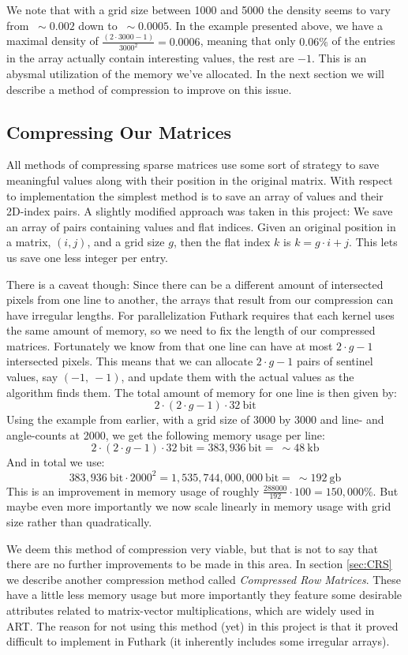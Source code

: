 We note that with a grid size between 1000 and 5000 the density seems to vary from $~\sim 0.002$ down to $~\sim 0.0005$.
In the example presented above, we have a maximal density of $\frac{(2 \cdot 3000 - 1)}{3000^2} = 0.0006$, meaning that only $0.06\%$ of the entries in the array actually contain interesting values, the rest are $-1$. 
This is an abysmal utilization of the memory we've allocated. In the next section we will describe a method of compression to improve on this issue.

\subsection{Compressing Our Matrices}
All methods of compressing sparse matrices use some sort of strategy to save meaningful values along with their position in the original matrix. With respect to implementation the simplest method is to save an array of values and their 2D-index pairs. A slightly modified approach was taken in this project: We save an array of pairs containing values and flat indices. Given an original position in a matrix, $(i, j)$, and a grid size $g$, then the flat index $k$ is $k = g \cdot i + j$. This lets us save one less integer per entry.

There is a caveat though: Since there can be a different amount of intersected pixels from one line to another, the arrays that result from our compression can have irregular lengths. For parallelization Futhark requires that each kernel uses the same amount of memory, so we need to fix the length of our compressed matrices. Fortunately we know from \cite{FCT} that one line can have at most $2 \cdot g - 1$ intersected pixels. This means that we can allocate $2 \cdot g - 1$ pairs of sentinel values, say $(-1,~-1)$, and update them with the actual values as the algorithm finds them. The total amount of memory for one line is then given by:
$$2 \cdot (2 \cdot g - 1) \cdot 32~\text{bit}$$
Using the example from earlier, with a grid size of 3000 by 3000 and line- and angle-counts at 2000, we get the following memory usage per line:
$$2 \cdot (2 \cdot g - 1) \cdot 32~\text{bit} = 383,936~\text{bit} = ~\sim 48~\text{kb}$$ 
And in total we use: 
$$383,936~\text{bit} \cdot 2000^2 = 1,535,744,000,000~\text{bit} = ~\sim 192~\text{gb}$$
This is an improvement in memory usage of roughly $\frac{288000}{192}\cdot100 = 150,000\%$. But maybe even more importantly we now scale linearly in memory usage with grid size rather than quadratically.

We deem this method of compression very viable, but that is not to say that there are no further improvements to be made in this area. In section \ref{sec:CRS} we describe another compression method called \emph{Compressed Row Matrices}. These have a little less memory usage but more importantly they feature some desirable attributes related to matrix-vector multiplications, which are widely used in ART. The reason for not using this method (yet) in this project is that it proved difficult to implement in Futhark (it inherently includes some irregular arrays).